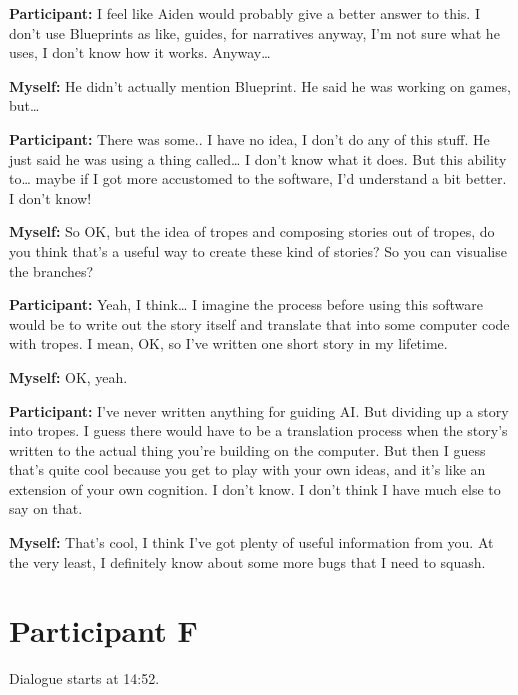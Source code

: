 \documentclass[11pt]{report}
\begin{document}
\begin{linenumbers}
\textbf{Participant:} I feel like Aiden would probably give a better answer to this. I don't use Blueprints as like, guides, for narratives anyway, I'm not sure what he uses, I don't know how it works. Anyway\ldots{}

\textbf{Myself:} He didn't actually mention Blueprint. He said he was working on games, but\ldots{}

\textbf{Participant:} There was some.. I have no idea, I don't do any of this stuff. He just said he was using a thing called\ldots{} I don't know what it does. But this ability to\ldots{} maybe if I got more accustomed to the software, I'd understand a bit better. I don't know!

\textbf{Myself:} So OK, but the idea of tropes and composing stories out of tropes, do you think that's a useful way to create these kind of stories? So you can visualise the branches?

\textbf{Participant:} Yeah, I think\ldots{} I imagine the process before using this software would be to write out the story itself and translate that into some computer code with tropes. I mean, OK, so I've written one short story in my lifetime.

\textbf{Myself:} OK, yeah.

\textbf{Participant:} I've never written anything for guiding AI. But dividing up a story into tropes. I guess there would have to be a translation process when the story's written to the actual thing you're building on the computer. But then I guess that's quite cool because you get to play with your own ideas, and it's like an extension of your own cognition. I don't know. I don't think I have much else to say on that.

\textbf{Myself:} That's cool, I think I've got plenty of useful information from you. At the very least, I definitely know about some more bugs that I need to squash.

\end{linenumbers}
\resetlinenumber[1]
\section{Participant F}
Dialogue starts at 14:52.
\end{document}
